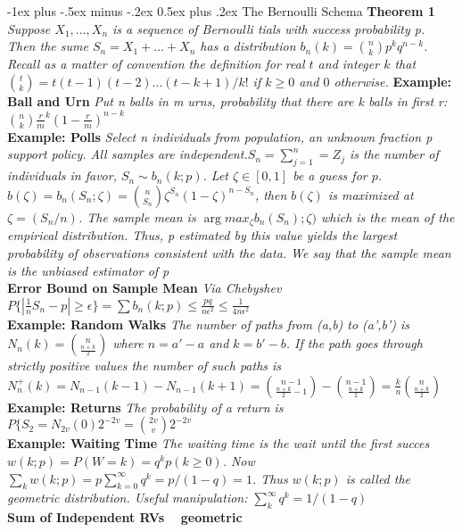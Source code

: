 \documentclass[10pt,landscape]{article}
\makeatletter
\renewcommand{\section}{\@startsection{section}{1}{0mm}%
                                {-1ex plus -.5ex minus -.2ex}%
                                {0.5ex plus .2ex}%
                                {\normalfont\large\bfseries}}
\makeatother
\begin{document}
\begin{multicols*}{3}
\section{The Bernoulli Schema}
\textbf{Theorem 1} \textit{Suppose $X_1,...,X_n$ is a sequence of Bernoulli tials with success probability p. Then the sume $S_n=X_1+...+X_n$ has a distribution $b_n(k)={n \choose k }p^kq^{n-k}$. Recall as a matter of convention the definition for real $t$ and integer $k$ that ${t \choose k} =t(t-1)(t-2)...(t-k+1)/k!$ if $k\geq 0$ and $0$ otherwise.}
\textbf{Example: Ball and Urn} \textit{Put n balls in m urns, probability that there are k balls in first r: ${n \choose k } \frac{r}{m}^k(1-\frac{r}{m})^{n-k}$}\\
\textbf{Example: Polls} \textit{Select n individuals from population, an unknown fraction p support policy. All samples are independent.$S_n=\sum_{j=1}^{n}=Z_j$ is the number of individuals in favor, $S_n \sim b_n(k;p)$. Let $\zeta \in [0,1]$ be a guess for $p$. $b(\zeta)=b_n(S_n;\zeta)={n \choose S_n}\zeta^{S_n}(1-\zeta)^{n-S_n}$, then $b(\zeta)$ is maximized at $\zeta=(S_n/n)$. The sample mean is $\arg max_{\zeta}b_n(S_n);\zeta)$ which is the mean of the empirical distribution. Thus, p  estimated by this value yields the largest probability of observations consistent with the data. We say that the sample mean is the unbiased estimator of p}\\
\textbf{Error Bound on Sample Mean} \textit{Via Chebyshev $P\{|\frac{1}{n}S_n -p|\geq\epsilon\}=\sum b_n(k;p) \leq \frac{pq}{n\epsilon^2}\leq \frac{1}{4n\epsilon^2}$}\\
\textbf{Example: Random Walks} \textit{The number of paths from (a,b) to (a',b') is $N_n(k)={n \choose \frac{n+k}{2}}$ where $n=a'-a$ and $k=b'-b$. If the path goes through strictly positive values the number of such paths is $N^{+}_{n}(k)=N_{n-1}(k-1)-N_{n-1}(k+1) = {n-1 \choose \frac{n+k}{2}-1}-{n-1 \choose \frac{n+k}{2}}=\frac{k}{n}{n \choose \frac{n+k}{2}}$}\\
\textbf{Example: Returns} \textit{The probability of a return is $ P\{S_{2}=N_{2v}(0)2^{-2v}={2v \choose v}2^{-2v}$}\\
\textbf{Example: Waiting Time} \textit{The waiting time is the wait until the first succes $w(k;p)=P(W=k)=q^kp (k\geq 0)$. Now $\sum_{k}w(k;p)=p \sum_{k=0}^{\infty}q^k=p/(1-q)=1$. Thus $w(k;p)$ is called the geometric distribution. Useful manipulation: $\sum_{k}^{\infty}q^k=1/(1-q)$}\\
\textbf{Sum of Independent RVs ~ geometric}\\

\end{multicols*}
\end{document}
